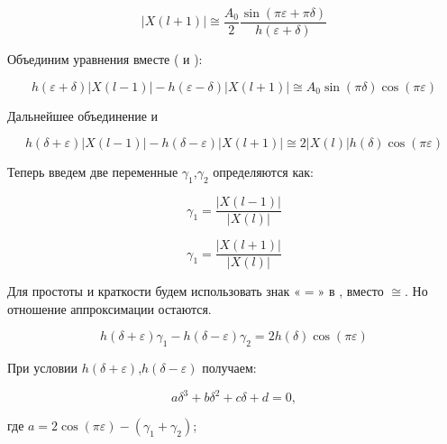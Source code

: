 \begin{equation}
	\label{eq:equation28}
	\left| {X(l+1)} \right| \cong \frac{A_0}{2} \frac{\sin{(\pi \varepsilon + \pi \delta)} }{h(\varepsilon + \delta)}
\end{equation}

Объединим уравнения вместе ( и ):

\begin{equation}
	\label{eq:equation29}
	h(\varepsilon+\delta)\left|{X(l-1)} \right| - h(\varepsilon-\delta) \left|{X(l+1)} \right| \cong A_0 \sin{(\pi \delta)} \cos{(\pi \varepsilon)}
\end{equation}

Дальнейшее объединение  и 

\begin{equation}
	\label{eq:equation30}
	h(\delta+\varepsilon)\left|{X(l-1)} \right| - h(\delta - \varepsilon) \left|{X(l+1)} \right| \cong 2 \left|{X(l)} \right| h(\delta) \cos{(\pi \varepsilon)}
\end{equation}

Теперь введем две переменные $\gamma_1$,$\gamma_2$ определяются как:

\begin{equation}
	\label{eq:equation31}
	\gamma_1 = \frac{\left| X(l-1)\right|}{\left| X(l)\right|}
\end{equation}

\begin{equation}
	\label{eq:equation32}
	\gamma_1 = \frac{\left| X(l+1)\right|}{\left| X(l)\right|}
\end{equation}

Для простоты и краткости будем использовать знак $«=»$ в , вместо $\cong$. Но отношение аппроксимации остаются. 

\begin{equation}
	\label{eq:equation33}
	h(\delta +\varepsilon)\gamma_1 - h(\delta -\varepsilon)\gamma_2 = 
	2h(\delta) \cos(\pi \varepsilon) 
\end{equation}

При условии $h(\delta +\varepsilon)$,$h(\delta -\varepsilon)$ получаем:

\begin{equation}
	\label{eq:equation34}
	{a \delta}^3 + {b \delta}^2 + c \delta + d = 0, 
\end{equation}

где $a = 2 \cos(\pi \varepsilon)-(\gamma_1 + \gamma_2)$;

